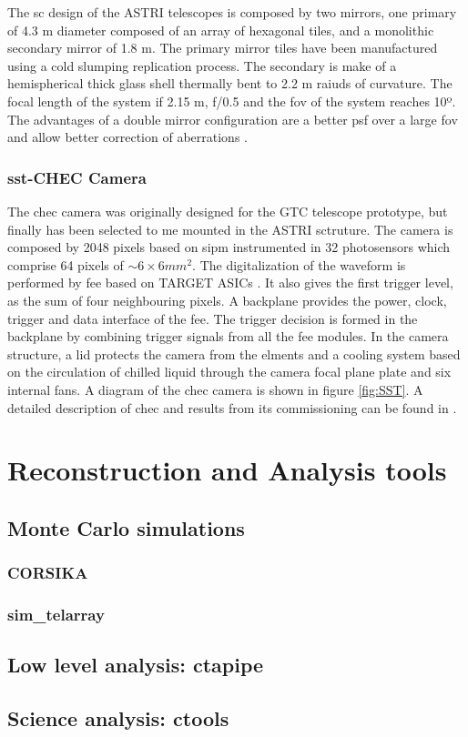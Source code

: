 \documentclass[main.tex]{subfiles}
\begin{document}
The \gls{sc} design of the ASTRI telescopes is composed by two mirrors, one primary of 4.3 m diameter composed of an array of hexagonal tiles, and a monolithic secondary mirror of 1.8 m. The primary mirror tiles have been manufactured using a cold slumping replication process. The secondary is make of a hemispherical thick glass shell thermally bent to 2.2 m raiuds of curvature. The focal length of the system if 2.15 m, f/0.5 and the \gls{fov} of the system reaches 10º.\\
The advantages of a double mirror configuration are a better \gls{psf} over a large \gls{fov} and allow better correction of aberrations \cite{2017ASTRItels}.

\subsubsection{\gls{sst}-CHEC Camera}

The \gls{chec} camera was originally designed for the GTC telescope prototype, but finally has been selected to me mounted in the ASTRI sctruture. The camera is composed by 2048 pixels based on \gls{sipm} instrumented in 32 photosensors which comprise 64 pixels of $\sim 6\times6 mm^2$. The digitalization of the waveform is performed by \gls{fee} based on TARGET ASICs \cite{2017TARGETASIC}. It also gives the first trigger level, as the sum of four neighbouring pixels. A backplane provides the power, clock, trigger and data interface of the \gls{fee}. The trigger decision is formed in the backplane by combining trigger signals from all the \gls{fee} modules. In the camera structure, a lid protects the camera from the elments and a cooling system based on the circulation of chilled liquid through the camera focal plane plate and six internal fans. A diagram of the \gls{chec} camera is shown in figure \ref{fig:SST}. A detailed description of \gls{chec} and results from its commissioning can be found in \cite{2017CHECcam}.

\section{Reconstruction and Analysis tools} \label{sec:ctaanalysis}
\subsection{Monte Carlo simulations}
\subsubsection{CORSIKA}
\subsubsection{sim\_telarray}
\subsection{Low level analysis: ctapipe}
\subsection{Science analysis: ctools}
\end{document}
